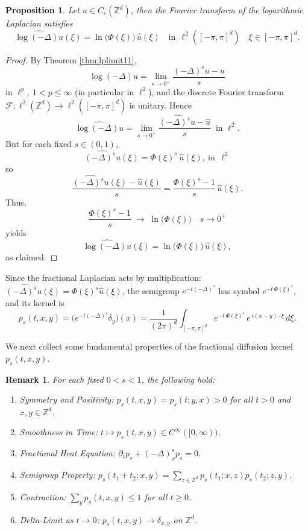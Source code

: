 \documentclass[reqno,12pt]{amsart}
\numberwithin{equation}{section}
\newtheorem{proposition}[theorem]{Proposition}
\newtheorem{remark}[theorem]{Remark}
\begin{document}
\begin{proposition}
	Let \(u\in C_c(\mathbb{Z}^d)\), then the Fourier transform of the logarithmic Laplacian satisfies
	\[
	\widehat{\log\left(-\Delta\right)u}(\xi)
	=\ln\!\bigl(\Phi(\xi)\bigr)\,\widehat u(\xi)\quad \text{in}\:\:\ell^2([-\pi,\pi]^d)
	\quad \xi\in[-\pi,\pi]^d.
	\]
\end{proposition}

\begin{proof}
	By Theorem \ref{thm:lplimit11}, 
	\[
	\log\left(-\Delta\right)u
	=\lim_{s\to0^+}\frac{(-\Delta)^s u - u}{s}
	\]
	in \(\ell^p,\:1<p\le \infty\) (in particular in \(\ell^2\)), and the discrete Fourier transform
	\(\mathcal F:\ell^2(\mathbb{Z}^d)\to \ell^2([-\pi,\pi]^d)\) is unitary.  Hence
	\[
	\widehat{\log\left(-\Delta\right)u}
	=\lim_{s\to0^+}
	\frac{\widehat{(-\Delta)^s u}-\widehat u}{s}
	\;\;\text{in }\ell^2.
	\]
	But for each fixed \(s\in(0,1)\),
	\[
	\widehat{(-\Delta)^s u}(\xi)
	=\Phi(\xi)^s\,\widehat u(\xi),\:\text{in}\:\:\ell^2
	\]
	so
	\[
	\frac{\widehat{(-\Delta)^s u}(\xi)-\widehat u(\xi)}{s}
	=\frac{\Phi(\xi)^s-1}{s}\,\widehat u(\xi).
	\]
Thus,
	\[
	\frac{\Phi(\xi)^s-1}{s}\;\longrightarrow\;\ln\!\bigl(\Phi(\xi)\bigr)
	\quad s\to0^+
	\]
yields
	\[
	\widehat{\log\left(-\Delta\right)u}(\xi)
	=\ln\!\bigl(\Phi(\xi)\bigr)\,\widehat u(\xi),
	\]
	as claimed.
\end{proof}

	Since the fractional Laplacian acts by multiplication:
\(\widehat{(-\Delta)^s u}(\xi)=\Phi(\xi)^s\widehat u(\xi)\), the semigroup \(e^{-t(-\Delta)^s}\) has symbol \(e^{-t\,\Phi(\xi)^s}\), and its kernel is
\[
p_s(t,x,y)
=\bigl(e^{-t(-\Delta)^s}\delta_y\bigr)(x)
=\frac{1}{(2\pi)^d}
\int_{[-\pi,\pi]^d}
e^{-t\,\Phi(\xi)^s}\,e^{\,i(x-y)\cdot\xi}\,d\xi.
\]

We next collect some fundamental properties of the fractional diffusion kernel \(p_s(t,x,y)\).


\begin{remark}
For each fixed \(0<s<1\), the following hold:
	\begin{enumerate}
		\item[(i)] \emph{Symmetry and Positivity:} 
		\(p_s(t,x,y)=p_s(t;y,x)>0\) for all \(t>0\) and \(x,y\in \mathbb{Z}^d\).
		\item[(ii)] \emph{Smoothness in Time:} 
		\(t\mapsto p_s(t,x,y)\in C^\infty([0,\infty))\).
		\item[(iii)] \emph{Fractional Heat Equation:}
		\(\partial_t p_s +(-\Delta)^s_x p_s=0\).
		\item[(iv)] \emph{Semigroup Property:}
		\(p_s(t_1+t_2;x,y)=\sum_{z\in \mathbb{Z}^d}p_s(t_1;x,z)p_s(t_2;z,y)\).
		\item[(v)] \emph{Contraction:}
		\(\sum_{y}p_s(t,x,y)\le1\) for all \(t\ge0\).
		\item[(vi)] \emph{Delta‐Limit as \(t\to0\):}
		\(p_s(t,x,y)\to\delta_{x,y}\) on \(\mathbb{Z}^d\).
	\end{enumerate}
\end{remark}
\end{document}
